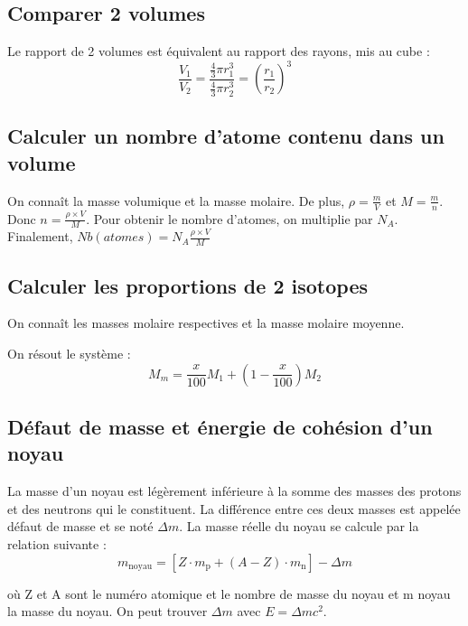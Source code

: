\documentclass[french]{yLectureNote}
\begin{document}
\subsection{Comparer 2 volumes}
Le rapport de 2 volumes est équivalent au rapport des rayons, mis au cube :
\[\frac{V_1}{V_2} = \frac{\frac{4}{3}\pi r_1^3}{\frac{4}{3}\pi r_2^3} = (\frac{r_1}{r_2})^3\]
\subsection{Calculer un nombre d'atome contenu dans un volume}
On connaît la masse volumique et la masse molaire. De plus, $\rho = \frac{m}{V}$ et $M = \frac{m}{n}$. Donc $n = \frac{\rho \times V}{M}$. Pour obtenir le nombre d'atomes, on multiplie par $N_A$. Finalement, $Nb(atomes) = N_A\frac{\rho \times V}{M}$
\subsection{Calculer les proportions de 2 isotopes}
On connaît les masses molaire respectives et la masse molaire moyenne.

On résout le système : \[M_m = \frac{x}{100}M_1 + (1-\frac{x}{100})M_2\]
\subsection{Défaut de masse et énergie de cohésion d'un noyau}
La masse d'un noyau est légèrement inférieure à la somme des masses des protons et des neutrons qui le constituent. La différence entre ces deux masses est appelée défaut de masse et se noté $\Delta m$. La masse réelle du noyau se calcule par la relation suivante : \[m_{\mathrm{noyau}} = [Z\cdot m_{\mathrm{p}} + (A - Z)\cdot m_{\mathrm{n}}] - \Delta m\]

où Z et A sont le numéro atomique et le nombre de masse du noyau et m noyau la masse du noyau. On peut trouver $\Delta m$ avec $E = \Delta m c^2$.

\end{document}
